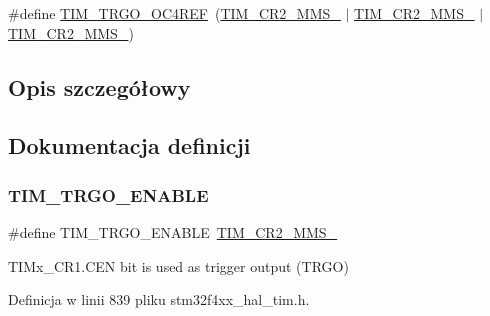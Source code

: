 \begin{DoxyCompactItemize}
\item 
\#define \hyperlink{group___t_i_m___master___mode___selection_ga7fe6228adec5d1b6f0a8ed8da111db4d}{T\+I\+M\+\_\+\+T\+R\+G\+O\+\_\+\+O\+C4\+R\+EF}~(\hyperlink{group___peripheral___registers___bits___definition_gacb74a815afdd856d51cfcf1ddf3fce6a}{T\+I\+M\+\_\+\+C\+R2\+\_\+\+M\+M\+S\+\_} $\vert$ \hyperlink{group___peripheral___registers___bits___definition_ga4b1036929b0a4ba5bd5cced9b8e0f4c3}{T\+I\+M\+\_\+\+C\+R2\+\_\+\+M\+M\+S\+\_} $\vert$ \hyperlink{group___peripheral___registers___bits___definition_gaf3e55308e84106d6501201e66bd46ab6}{T\+I\+M\+\_\+\+C\+R2\+\_\+\+M\+M\+S\+\_})
\end{DoxyCompactItemize}


\subsection{Opis szczegółowy}


\subsection{Dokumentacja definicji}
\mbox{\label{group___t_i_m___master___mode___selection_ga4ac300b0fd24d1e6532e5961680a39a9}} 
\subsubsection{\texorpdfstring{T\+I\+M\+\_\+\+T\+R\+G\+O\+\_\+\+E\+N\+A\+B\+LE}{TIM\_TRGO\_ENABLE}}
{\footnotesize\ttfamily \#define T\+I\+M\+\_\+\+T\+R\+G\+O\+\_\+\+E\+N\+A\+B\+LE~\hyperlink{group___peripheral___registers___bits___definition_gaf3e55308e84106d6501201e66bd46ab6}{T\+I\+M\+\_\+\+C\+R2\+\_\+\+M\+M\+S\+\_}}

T\+I\+Mx\+\_\+\+C\+R1.\+C\+EN bit is used as trigger output (T\+R\+GO) 

Definicja w linii 839 pliku stm32f4xx\+\_\+hal\+\_\+tim.\+h.

\mbox{\label{group___t_i_m___master___mode___selection_ga80aa9a9c41de509d99fc4cb492d6513f}} 
